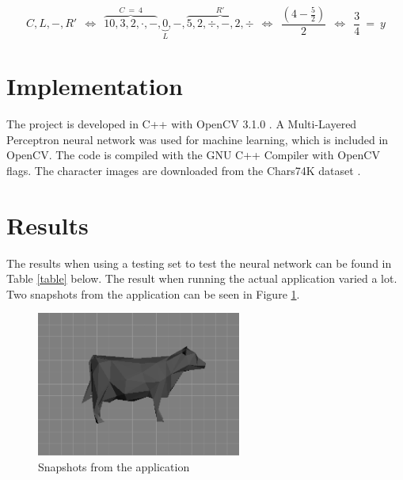 \documentclass[12pt]{report}
\begin{document}
\begin{equation}
  \label{eq:3}
  C,L,-,R' \ \ \iff \ \  \overbrace{10,3,2,\cdot,-}^{C \ = \ 4},\underbrace{0}_{L},-,\overbrace{5,2,\div,-,2,\div}^{R'} \ \ \iff \ \ \frac{(4-\frac{5}{2})}{2} \ \ \iff \ \ \frac{3}{4} \ = \ y
\end{equation}


\section*{Implementation}

The project is developed in C++ with OpenCV 3.1.0 \cite{opencv}. A Multi-Layered Perceptron neural network was used for machine learning, which is included in OpenCV.  The code is compiled with the GNU C++ Compiler with OpenCV flags.  The character images are downloaded from the Chars74K dataset \cite{dataset}.


\section*{Results}

The results when using a testing set to test the neural network can be found in Table \ref{table} below. The result when running the actual application varied a lot. Two snapshots from the application can be seen in Figure \ref{fig:result}.

\begin{figure}[!ht]
	\centering
	\includegraphics[width=0.6\textwidth]{figure.png}
	\caption{\label{fig:result} Snapshots from the application}
	\centering
\end{figure}
\end{document}
